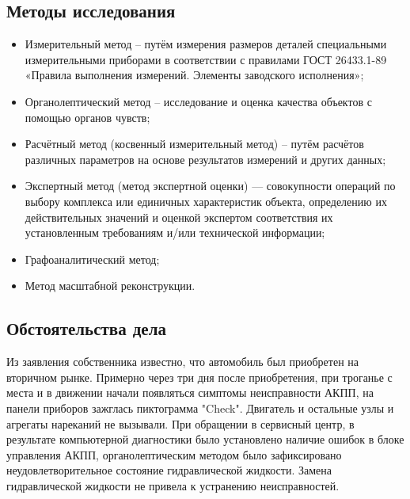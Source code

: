 \subsection{Методы исследования}

\begin{itemize}
\item 
Измерительный метод – путём измерения размеров деталей специальными измерительными приборами в соответствии с правилами ГОСТ 26433.1-89 «Правила выполнения измерений. Элементы заводского исполнения»;
\item  
Органолептический метод – исследование и оценка качества объектов с помощью органов чувств;
\item 
Расчётный метод (косвенный измерительный метод) – путём расчётов различных параметров на основе результатов измерений и других данных;
\item 
Экспертный метод (метод экспертной оценки) — совокупности операций по выбору комплекса или единичных характеристик объекта, определению их действительных значений и оценкой экспертом соответствия их установленным требованиям и/или технической информации;
\item 
Графоаналитический метод;
\item 
Метод масштабной  реконструкции.
\end{itemize}
%
%
%
%
\subsection{Обстоятельства дела}

Из заявления  собственника известно, что автомобиль был приобретен на вторичном рынке. Примерно через три дня после приобретения,  при троганье с места и в движении начали появляться симптомы неисправности АКПП, на панели приборов зажглась пиктограмма "Check". Двигатель и остальные узлы и агрегаты нареканий не вызывали.  При обращении в сервисный центр, в результате компьютерной диагностики   было установлено наличие ошибок в блоке управления АКПП, органолептическим методом было зафиксировано  неудовлетворительное состояние гидравлической жидкости. Замена гидравлической жидкости не привела к устранению неисправностей.    

